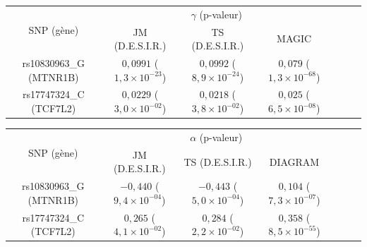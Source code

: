 \documentclass[10pt,  xcolors={RGB}, hyperref={%
    pdfpagelabels=false,
    colorlinks=true,
    pdftex=true,
    bookmarks=true,
    bookmarksopen=true,
    hyperfootnotes=true}]{beamer}
\begin{document}
\begin{frame}{\subsecname}
    \everymath{\color{black}}
    \begin{center}
        \begin{table}
            {\fontsize{8pt}{12pt}\selectfont
                \begin{tabular}{ccccccc}
                    \hline
                    \multirow{2}{*}{SNP (gène)} & \multicolumn{3}{c}{$\gamma$ (p-valeur)}\\
                    & JM (D.E.S.I.R.) & TS (D.E.S.I.R.) & MAGIC\\
                    \hline
                    rs10830963\_G (MTNR1B) & $0,0991$ ($1,3\times 10^{-23}$) & $0,0992$ ($8,9\times 10^{-24}$) & $0,079$ ($1,3\times 10^{-68}$)\\
                    rs17747324\_C (TCF7L2) & $0,0229$ ($3,0\times 10^{-02}$) & $0,0218$ ($3,8\times 10^{-02}$) & $0,025$ ($6,5\times 10^{-08}$)\\
                    \hline
                \end{tabular}
            }
        \end{table}
    	 \begin{table}
            {\fontsize{8pt}{12pt}\selectfont
                \begin{tabular}{ccccccc}
                    \hline
                    \multirow{2}{*}{SNP (gène)} & \multicolumn{3}{c}{$\alpha$ (p-valeur)}\\
                    & JM (D.E.S.I.R.) & TS (D.E.S.I.R.) & DIAGRAM\\
                    \hline
                    rs10830963\_G (MTNR1B) & $-0,440$ ($9,4\times 10^{-04}$) & $-0,443$ ($5,0\times 10^{-04}$) & $0,104$ ($7,3\times 10^{-07}$)\\
                    rs17747324\_C (TCF7L2) & $0,265$ ($4,1\times 10^{-02}$) & $0,284$ ($2,2\times 10^{-02}$) & $0,358$ ($8,5\times 10^{-55}$)\\
                    \hline
                \end{tabular}
            }
        \end{table}
    \end{center}
    \everymath{\color{dodgerblue}}
\end{frame}
\end{document}
